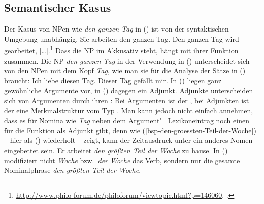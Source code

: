 \subsection{Semantischer Kasus}

%
Der Kasus von NPen wie \emph{den ganzen Tag} in () ist von der syntaktischen Umgebung unabhängig.
\eal
\ex Sie arbeiten den ganzen Tag.
\ex Den ganzen Tag wird gearbeitet, [\ldots].\footnote{
  \url{http://www.philo-forum.de/philoforum/viewtopic.html?p=146060}. .
}
\zl
Dass die NP im Akkusativ steht, hängt mit ihrer Funktion zusammen. Die NP \emph{den ganzen Tag} in
der Verwendung in () unterscheidet sich von den NPen mit dem Kopf \emph{Tag}, wie
man sie für die Analyse der Sätze in () braucht:
\eal
\ex Ich liebe diesen Tag.
\ex Dieser Tag gefällt mir.
\zl
In () liegen ganz gewöhnliche Argumente vor, in () dagegen ein Adjunkt. Adjunkte
unterscheiden sich von Argumenten durch ihren \modw: Bei Argumenten ist der \modw {},
bei Adjunkten ist der \modw eine Merkmalstruktur vom Typ . Man kann jedoch nicht
einfach annehmen, dass es für Nomina wie \emph{Tag} neben dem Argument"=Lexikoneintrag noch einen für
die Funktion als Adjunkt gibt, denn wie (\ref{bsp-den-groessten-Teil-der-Woche}) -- hier als
() wiederholt -- zeigt, kann der Zeitausdruck unter ein anderes Nomen eingebettet sein.
\ea
\label{bsp-den-groessten-Teil-der-Woche-zwei}
Er arbeitet \emph{den größten Teil der Woche} zu hause.
\z
In () modifiziert nicht \emph{Woche} bzw.\ \emph{der Woche} das Verb, sondern nur die gesamte
Nominalphrase \emph{den größten Teil der Woche}. 


